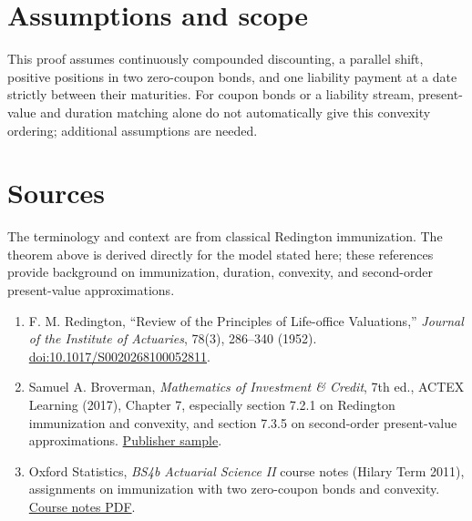 \documentclass[11pt]{article}
\begin{document}
\section*{Assumptions and scope}
This proof assumes continuously compounded discounting, a parallel shift, positive positions in two zero-coupon bonds, and one liability payment at a date strictly between their maturities. For coupon bonds or a liability stream, present-value and duration matching alone do not automatically give this convexity ordering; additional assumptions are needed.
\section*{Sources}
The terminology and context are from classical Redington immunization. The theorem above is derived directly for the model stated here; these references provide background on immunization, duration, convexity, and second-order present-value approximations.
\begin{enumerate}
\item F. M. Redington, ``Review of the Principles of Life-office Valuations,'' \emph{Journal of the Institute of Actuaries}, 78(3), 286--340 (1952). \href{https://doi.org/10.1017/S0020268100052811}{doi:10.1017/S0020268100052811}.
\item Samuel A. Broverman, \emph{Mathematics of Investment \& Credit}, 7th ed., ACTEX Learning (2017), Chapter 7, especially section 7.2.1 on Redington immunization and convexity, and section 7.3.5 on second-order present-value approximations. \href{https://www.actuarialbookstore.com/samples/ACTEX_2FM-ACT-882216_sample_12-18-17.pdf}{Publisher sample}.
\item Oxford Statistics, \emph{BS4b Actuarial Science II} course notes (Hilary Term 2011), assignments on immunization with two zero-coupon bonds and convexity. \href{https://www.stats.ox.ac.uk/~winkel/bs4b11.pdf}{Course notes PDF}.
\end{enumerate}
\end{document}
